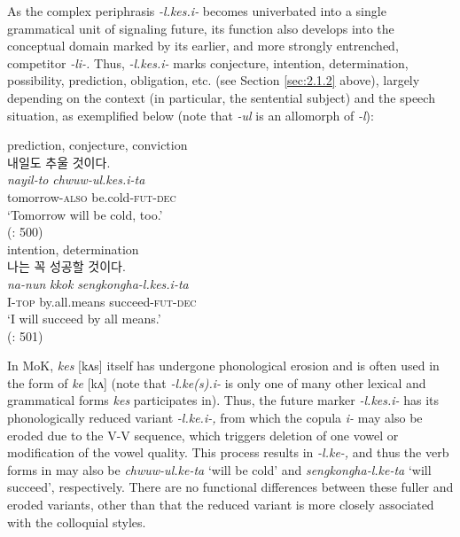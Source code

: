 \documentclass[output=paper,colorlinks,citecolor=brown]{langscibook}
\begin{document}
\largerpage[-1]

As the complex periphrasis \textit{-l.kes.i-} becomes univerbated into a single grammatical unit of signaling future, its function also develops into the conceptual domain marked by its earlier, and more strongly entrenched, competitor \textit{-li-.} Thus, \textit{-l.kes.i-} marks conjecture, intention, determination, possibility, prediction, obligation, etc. (see Section \ref{sec:2.1.2} above), largely depending on the context (in particular, the sentential subject) and the speech situation, as exemplified below (note that \textit{-ul} is an allomorph of \textit{-l}):

\ea \label{ex:rhee:7}
    \ea prediction, conjecture, conviction\\
    \textkorean{내일도 추울 것이다}.\\
    \gll \textit{nayil-to} \textit{chwuw-ul.kes.i-ta}\\
         tomorrow-\textsc{also} be.cold-\textsc{fut-dec}\\
    \glt ‘Tomorrow will be cold, too.’\\
    \hfill (\cite{Lee2010}: 500)\\

    \ex intention, determination\\
    \textkorean{나는 꼭 성공할 것이다}.\\
    \gll \textit{na-nun} \textit{kkok} \textit{sengkongha-l.kes.i-ta}\\
         I-\textsc{top} by.all.means succeed-\textsc{fut-dec}\\
    \glt ‘I will succeed by all means.’\\
    \hfill (\cite{Lee2010}: 501)\\
    \z
\z

In MoK, \textit{kes} [kʌs] itself has undergone phonological erosion and is often used in the form of \textit{ke} [kʌ] (note that \textit{-l.ke(s).i-} is only one of many other lexical and grammatical forms \textit{kes} participates in). Thus, the future marker \textit{-l.kes.i-} has its phonologically reduced variant \textit{-l.ke.i-, }from which the copula \textit{i- }may also be eroded due to the V-V sequence, which triggers deletion of one vowel or modification of the vowel quality. This process results in \textit{-l.ke-,} and thus the verb forms in  may also be \textit{chwuw-ul.ke-ta} `will be cold' and \textit{sengkongha-l.ke-ta} ‘will succeed’, respectively. There are no functional differences between these fuller and eroded variants, other than that the reduced variant is more closely associated with the colloquial styles.
\end{document}
